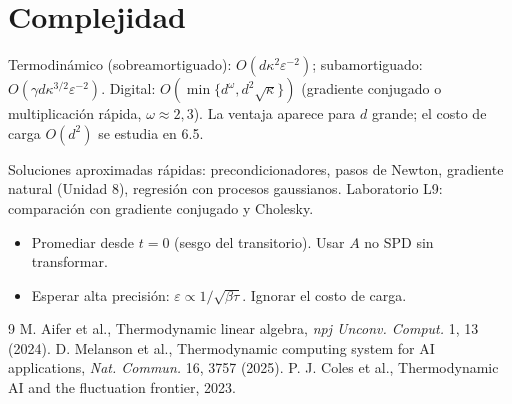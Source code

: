 \documentclass[11pt,a4paper]{article}
\begin{document}
\section{Complejidad}
Termodinámico (sobreamortiguado): $O(d\kappa^2\varepsilon^{-2})$; subamortiguado: $O(\gamma d\kappa^{3/2}\varepsilon^{-2})$. Digital: $O(\min\{d^\omega,d^2\sqrt\kappa\})$
(gradiente conjugado o multiplicación rápida, $\omega\approx2{,}3$). La ventaja aparece para $d$ grande; el costo de carga $O(d^2)$ se estudia en 6.5.

\begin{aplicacion}
Soluciones aproximadas rápidas: precondicionadores, pasos de Newton, gradiente natural (Unidad 8), regresión con procesos gaussianos. Laboratorio L9:
comparación con gradiente conjugado y Cholesky.
\end{aplicacion}

\begin{error}
\begin{itemize}[nosep]
\item Promediar desde $t=0$ (sesgo del transitorio). \quad Usar $A$ no SPD sin transformar.
\item Esperar alta precisión: $\varepsilon\propto1/\sqrt{\beta\tau}$. \quad Ignorar el costo de carga.
\end{itemize}
\end{error}

\begin{thebibliography}{9}\small
{} M. Aifer et al., Thermodynamic linear algebra, \emph{npj Unconv. Comput.} 1, 13 (2024).
 D. Melanson et al., Thermodynamic computing system for AI applications, \emph{Nat. Commun.} 16, 3757 (2025).
 P. J. Coles et al., Thermodynamic AI and the fluctuation frontier, 2023.
\end{thebibliography}
\end{document}
